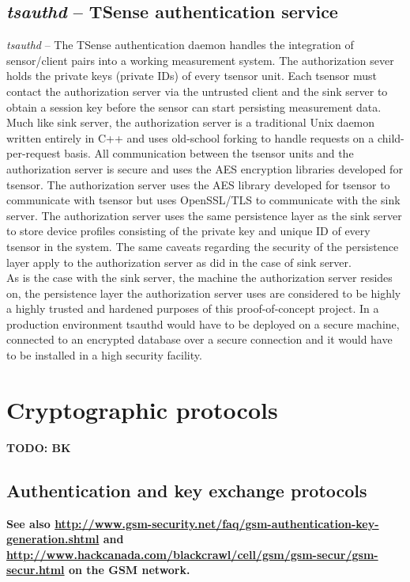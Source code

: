 \subsection{\textit{tsauthd} -- TSense authentication service}

\textit{tsauthd} -- The TSense authentication daemon handles the integration of sensor/client pairs into a working measurement system. The authorization sever holds the private keys (private IDs) of every tsensor unit. Each tsensor must contact the authorization server via the untrusted client and the sink server to obtain a session key before the sensor can start persisting measurement data.  Much like sink server, the authorization server is a traditional Unix daemon written  entirely in C++ and uses old-school forking to handle requests on a child-per-request basis. All communication between the tsensor units and the authorization server is secure and uses the AES encryption libraries developed for tsensor.  The authorization server uses the AES library developed for tsensor to communicate with tsensor but uses OpenSSL/TLS to communicate with the sink server. The authorization server uses the same persistence layer as the sink server to store device profiles consisting of the private key and unique ID of every tsensor in the system. The same caveats regarding the security of the persistence layer apply to the authorization server as did in the case of sink server.\\ 


As is the case with the sink server, the machine the authorization server resides on, the persistence layer the authorization server uses are considered to be highly a highly trusted and hardened purposes of this proof-of-concept project. In a production environment tsauthd would have to be deployed on a secure machine, connected to an encrypted database over a secure connection and it would have to be installed in a high security facility.

\section{Cryptographic protocols}

\textbf{TODO: BK}

\subsection{Authentication and key exchange protocols}

\textbf{See also \url{http://www.gsm-security.net/faq/gsm-authentication-key-generation.shtml} and \url{http://www.hackcanada.com/blackcrawl/cell/gsm/gsm-secur/gsm-secur.html} on the GSM network.}

